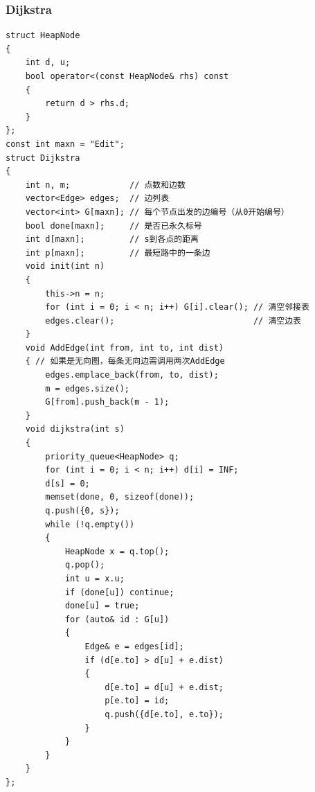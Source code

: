 \documentclass[twoside]{article}
\begin{document}
\subsubsection{Dijkstra}
\begin{lstlisting}
struct HeapNode
{
    int d, u;
    bool operator<(const HeapNode& rhs) const
    {
        return d > rhs.d;
    }
};
const int maxn = "Edit";
struct Dijkstra
{
    int n, m;            // 点数和边数
    vector<Edge> edges;  // 边列表
    vector<int> G[maxn]; // 每个节点出发的边编号（从0开始编号）
    bool done[maxn];     // 是否已永久标号
    int d[maxn];         // s到各点的距离
    int p[maxn];         // 最短路中的一条边
    void init(int n)
    {
        this->n = n;
        for (int i = 0; i < n; i++) G[i].clear(); // 清空邻接表
        edges.clear();                            // 清空边表
    }
    void AddEdge(int from, int to, int dist)
    { // 如果是无向图，每条无向边需调用两次AddEdge
        edges.emplace_back(from, to, dist);
        m = edges.size();
        G[from].push_back(m - 1);
    }
    void dijkstra(int s)
    {
        priority_queue<HeapNode> q;
        for (int i = 0; i < n; i++) d[i] = INF;
        d[s] = 0;
        memset(done, 0, sizeof(done));
        q.push({0, s});
        while (!q.empty())
        {
            HeapNode x = q.top();
            q.pop();
            int u = x.u;
            if (done[u]) continue;
            done[u] = true;
            for (auto& id : G[u])
            {
                Edge& e = edges[id];
                if (d[e.to] > d[u] + e.dist)
                {
                    d[e.to] = d[u] + e.dist;
                    p[e.to] = id;
                    q.push({d[e.to], e.to});
                }
            }
        }
    }
};
\end{lstlisting}
\end{document}

